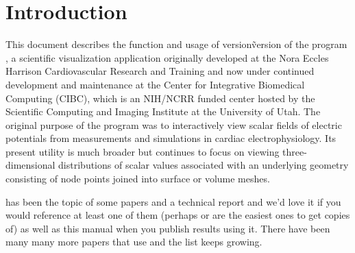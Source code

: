 \section{Introduction}

This document describes the function and usage of version\~version{} of the
program \map{}, a scientific visualization application originally developed
at the Nora Eccles Harrison Cardiovascular Research and Training
 and now under
continued development and maintenance at the Center for Integrative
Biomedical Computing (CIBC), which is an NIH/NCRR funded center hosted by
the Scientific Computing and Imaging Institute
 at the University of
Utah.  The original purpose of the program was to interactively view scalar
fields of electric potentials from measurements and simulations in cardiac
electrophysiology.  Its present utility is much broader but continues to
focus on viewing three-dimensional distributions of scalar values
associated with an underlying geometry consisting of node points joined
into surface or volume meshes.

\map{} has been the topic of some papers
\cite{RSM:Mac92c,RSM:Mac92d,RSM:Mac93,RSM:Mac93a} and a technical report
\cite{RSM:Mac94d} and we'd love it if you would reference at least one of
them (perhaps \cite{RSM:Mac93} or \cite{RSM:Mac93a} are the easiest ones to
get copies of) as well as this manual when you publish results using it.
There have been many many more papers that use \map{} and the list keeps
growing.\cite{RSM:Mac93,RSM:Mac93a,RSM:Mac94d,RSM:Mac94c,RSM:Mac94f,RSM:Mac95d,RSM:Mac97,RSM:Mac98,RSM:Mac2000a,RSM:Mac2001,RSM:Pun98,RSM:Pun99,RSM:Tac92,RSM:Tac92b,RSM:Tac94,RSM:Tac96,RSM:Tac96b,RSM:Tac97b,RSM:Ni98,RSM:Ni99,RSM:Ni2000b,RSM:Lux96,RSM:Lux2001,CRJ:Joh93b,CRJ:Joh93d,CRJ:Joh94,CRJ:Joh94b,RSM:Pun2003,RSM:Ser2002}

